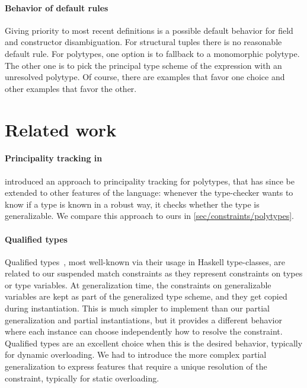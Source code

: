 \documentclass[acmsmall,screen,nonacm,review]{acmart}
\begin{document}
\paragraph{Behavior of default rules} Giving priority to most recent
definitions is a possible default behavior for field and constructor
disambiguation. For structural tuples there is no reasonable default
rule.
%
For polytypes, one option is to fallback to a monomorphic polytype. The
other one is to pick the principal type scheme of the expression with an
unresolved polytype. Of course, there are examples that favor one choice
and other examples that favor the other.

\section{Related work}
\label{sec:related-work}


\paragraph{Principality tracking in \OCaml}
\citet*{Garrigue-Remy/poly-ml} introduced an approach to principality
tracking for polytypes, that has since be extended to other features
of the \OCaml language: whenever the type-checker wants to know if
a type is known in a robust way, it checks whether the type is
generalizable. We compare this approach to ours in
\cref{sec/constraints/polytypes}.

\paragraph{Qualified types} Qualified
types~\citep*{jones-qualified-types}, most well-known via their usage
in Haskell type-classes, are related to our suspended match
constraints as they represent constraints on types or type
variables. At generalization time, the constraints on generalizable
variables are kept as part of the generalized type scheme, and they
get copied during instantiation. This is much simpler to implement
than our partial generalization and partial instantiations, but it
provides a different behavior where each instance can choose
independently how to resolve the constraint. Qualified types are an
excellent choice when this is the desired behavior, typically for
dynamic overloading. We had to introduce the more complex partial
generalization to express features that require a unique resolution of
the constraint, typically for static overloading.
\end{document}
